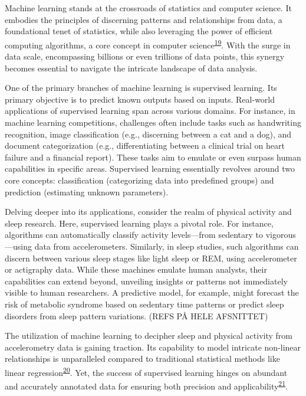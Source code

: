 \documentclass[
  9pt,
]{article}
\begin{document}
Machine learning stands at the crossroads of statistics and computer
science. It embodies the principles of discerning patterns and
relationships from data, a foundational tenet of statistics, while also
leveraging the power of efficient computing algorithms, a core concept
in computer
science\textsuperscript{\protect\hyperlink{ref-hastie01statisticallearning}{19}}.
With the surge in data scale, encompassing billions or even trillions of
data points, this synergy becomes essential to navigate the intricate
landscape of data analysis.

One of the primary branches of machine learning is supervised learning.
Its primary objective is to predict known outputs based on inputs.
Real-world applications of supervised learning span across various
domains. For instance, in machine learning competitions, challenges
often include tasks such as handwriting recognition, image
classification (e.g., discerning between a cat and a dog), and document
categorization (e.g., differentiating between a clinical trial on heart
failure and a financial report). These tasks aim to emulate or even
surpass human capabilities in specific areas. Supervised learning
essentially revolves around two core concepts: classification
(categorizing data into predefined groups) and prediction (estimating
unknown parameters).

Delving deeper into its applications, consider the realm of physical
activity and sleep research. Here, supervised learning plays a pivotal
role. For instance, algorithms can automatically classify activity
levels---from sedentary to vigorous---using data from accelerometers.
Similarly, in sleep studies, such algorithms can discern between various
sleep stages like light sleep or REM, using accelerometer or actigraphy
data. While these machines emulate human analysts, their capabilities
can extend beyond, unveiling insights or patterns not immediately
visible to human researchers. A predictive model, for example, might
forecast the risk of metabolic syndrome based on sedentary time patterns
or predict sleep disorders from sleep pattern variations. (REFS PÅ HELE
AFSNITTET)

The utilization of machine learning to decipher sleep and physical
activity from accelerometry data is gaining traction. Its capability to
model intricate non-linear relationships is unparalleled compared to
traditional statistical methods like linear
regression\textsuperscript{\protect\hyperlink{ref-fiorillo_automated_2019}{20}}.
Yet, the success of supervised learning hinges on abundant and
accurately annotated data for ensuring both precision and
applicability\textsuperscript{\protect\hyperlink{ref-van_der_ploeg_modern_2014}{21}}.
\end{document}

